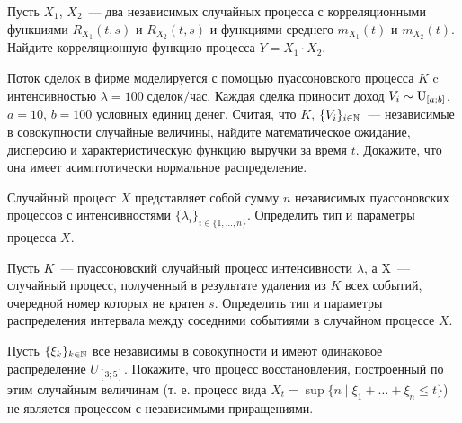 \documentclass[12pt]{article}
\def\canon{\textbf{(каноническое задание)}}
\begin{document}
\begin{exercise}
    Пусть $ X_1 $, $ X_2 $~--- два независимых случайных процесса с корреляционными функциями $ R_{X_1}(t, s) $ и $ R_{X_2}(t, s) $
    и функциями среднего $ m_{X_1}(t) $ и $ m_{X_2}(t) $.
    Найдите корреляционную функцию процесса $ Y = X_1 \cdot X_2 $.
\end{exercise}

\newpage




\begin{exercise}[subtitle={\canon}]
    Поток сделок в фирме моделируется с помощью пуассоновского процесса $ K $ c интенсивностью $ \lambda = 100 \; \text{сделок}/\text{час} $.
    Каждая сделка приносит доход $ V_i \sim \textnormal{U}_{[a;b]} $, $ a = 10 $, $ b = 100 $ условных единиц денег.
    Считая, что $ K $, $ \{ V_i \}_{i \in \mathbb{N}} $~--- независимые в совокупности случайные величины,
    найдите математическое ожидание, дисперсию и характеристическую функцию выручки за время $ t $.
    Докажите, что она имеет асимптотически нормальное распределение.
\end{exercise}


\begin{exercise}[subtitle={\canon}]
    Случайный процесс $ X $ представляет собой сумму $ n $ независимых пуассоновских процессов
    с интенсивностями $ \{ \lambda_i \}_{i \in \{1, \ldots, n\}} $.
    Определить тип и параметры процесса $ X $.
\end{exercise}


\begin{exercise}[subtitle={\canon}]
    Пусть $ K $~--- пуассоновский случайный процесс интенсивности $ \lambda $,
    а X~--- случайный процесс, полученный в результате удаления из $ K $ всех событий,
    очередной номер которых не кратен $ s $.
    Определить тип и параметры распределения интервала между соседними событиями в случайном процессе $ X $.
\end{exercise}


\begin{exercise}
    Пусть $ \{ \xi_k \}_{k \in \mathbb{N}} $ все независимы в совокупности и имеют одинаковое распределение $ U_{[3;5]} $.
    Покажите, что процесс восстановления, построенный по этим случайным величинам
    (т. е. процесс вида $ X_t = \sup\{n \mid \xi_1 + \ldots + \xi_n \leqslant t\} $)
    не является процессом с независимыми приращениями.
\end{exercise}
\end{document}
